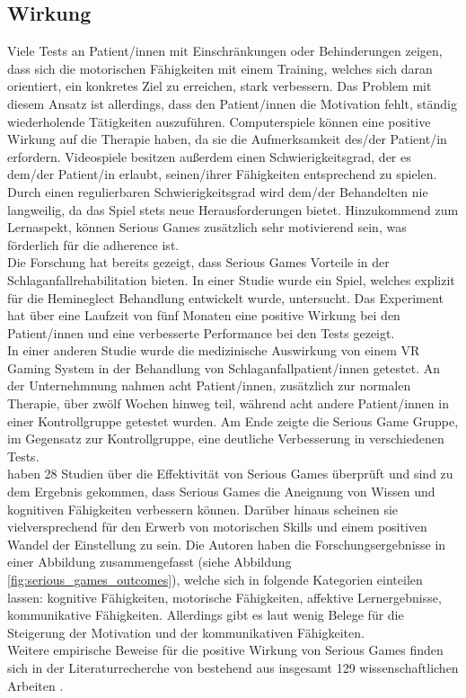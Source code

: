 \subsection{Wirkung}
Viele Tests an Patient/innen mit Einschränkungen oder Behinderungen zeigen, dass sich die motorischen Fähigkeiten mit einem Training, welches sich daran orientiert, ein konkretes Ziel zu erreichen, stark verbessern. Das Problem mit diesem Ansatz ist allerdings, dass den Patient/innen die Motivation fehlt, ständig wiederholende Tätigkeiten auszuführen. Computerspiele können eine positive Wirkung auf die Therapie haben, da sie die Aufmerksamkeit des/der Patient/in erfordern. Videospiele besitzen außerdem einen Schwierigkeitsgrad, der es dem/der Patient/in erlaubt, seinen/ihrer Fähigkeiten entsprechend zu spielen. Durch einen regulierbaren Schwierigkeitsgrad wird dem/der Behandelten nie langweilig, da das Spiel stets neue Herausforderungen bietet. Hinzukommend zum Lernaspekt, können Serious Games zusätzlich sehr motivierend sein, was förderlich für die \Gls{adherence} ist. \cite{burke:2009:optimising} \\
Die Forschung hat bereits gezeigt, dass Serious Games Vorteile in der Schlaganfallrehabilitation bieten. In einer Studie wurde ein Spiel, welches explizit für die Hemineglect Behandlung entwickelt wurde, untersucht. Das Experiment hat über eine Laufzeit von fünf Monaten eine positive Wirkung bei den Patient/innen und eine verbesserte Performance bei den Tests gezeigt. \cite{mainetti:2013:duckneglect} \\
In einer anderen Studie wurde die medizinische Auswirkung von einem \ac{VR} Gaming System in der Behandlung von Schlaganfallpatient/innen getestet. An der Unternehmnung nahmen acht Patient/innen, zusätzlich zur normalen Therapie, über zwölf Wochen hinweg teil, während acht andere Patient/innen in einer Kontrollgruppe getestet wurden. Am Ende zeigte die Serious Game Gruppe, im Gegensatz zur Kontrollgruppe, eine deutliche Verbesserung in verschiedenen Tests. \cite{cameirao:2011:virtual_reality} \\
\citeauthor{wouters:2009:practices} haben 28 Studien über die Effektivität von Serious Games überprüft und sind zu dem Ergebnis gekommen, dass Serious Games die Aneignung von Wissen und kognitiven Fähigkeiten verbessern können. Darüber hinaus scheinen sie vielversprechend für den Erwerb von motorischen Skills und einem positiven Wandel der Einstellung zu sein. Die Autoren haben die Forschungsergebnisse in einer Abbildung zusammengefasst (siehe Abbildung \ref{fig:serious_games_outcomes}), welche sich in folgende Kategorien einteilen lassen: kognitive Fähigkeiten, motorische Fähigkeiten, affektive Lernergebnisse, kommunikative Fähigkeiten. Allerdings gibt es laut \citeauthor{wouters:2009:practices} wenig Belege für die Steigerung der Motivation und der kommunikativen Fähigkeiten. \cite{wouters:2009:practices} \\ 
Weitere empirische Beweise für die positive Wirkung von Serious Games finden sich in der Literaturrecherche von \citeauthor{connolly:2012:systematic} bestehend aus insgesamt 129 wissenschaftlichen Arbeiten \cite{connolly:2012:systematic}. 

